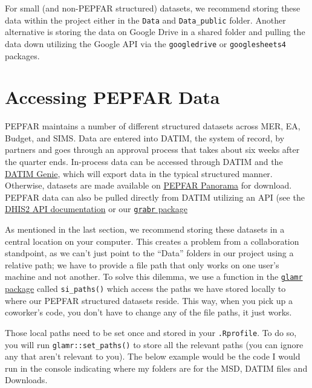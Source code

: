 \documentclass[
  letterpaper,
  DIV=11,
  numbers=noendperiod]{scrreprt}
\begin{document}
For small (and non-PEPFAR structured) datasets, we recommend storing
these data within the project either in the \texttt{Data} and
\texttt{Data\_public} folder. Another alternative is storing the data on
Google Drive in a shared folder and pulling the data down utilizing the
Google API via the \texttt{googledrive} or \texttt{googlesheets4}
packages.

\hypertarget{accessing-pepfar-data}{%
\section{Accessing PEPFAR Data}\label{accessing-pepfar-data}}

PEPFAR maintains a number of different structured datasets across MER,
EA, Budget, and SIMS. Data are entered into DATIM, the system of record,
by partners and goes through an approval process that takes about six
weeks after the quarter ends. In-process data can be accessed through
DATIM and the \href{https://www.datim.org/}{DATIM Genie}, which will
export data in the typical structured manner. Otherwise, datasets are
made available on \href{https://pepfar-panorama.org/}{PEPFAR Panorama}
for download. PEPFAR data can also be pulled directly from DATIM
utilizing an API (see the
\href{https://docs.dhis2.org/en/develop/using-the-api/dhis-core-version-240/introduction.html}{DHIS2
API documentation} or our
\href{https://usaid-oha-si.github.io/grabr/}{\texttt{grabr} package}

As mentioned in the last section, we recommend storing these datasets in
a central location on your computer. This creates a problem from a
collaboration standpoint, as we can't just point to the ``Data'' folders
in our project using a relative path; we have to provide a file path
that only works on one user's machine and not another. To solve this
dilemma, we use a function in the
\href{https://usaid-oha-si.github.io/glamr}{\texttt{glamr} package}
called \texttt{si\_paths()} which access the paths we have stored
locally to where our PEPFAR structured datasets reside. This way, when
you pick up a coworker's code, you don't have to change any of the file
paths, it just works.

Those local paths need to be set once and stored in your
\texttt{.Rprofile}. To do so, you will run \texttt{glamr::set\_paths()}
to store all the relevant paths (you can ignore any that aren't relevant
to you). The below example would be the code I would run in the console
indicating where my folders are for the MSD, DATIM files and Downloads.
\end{document}
